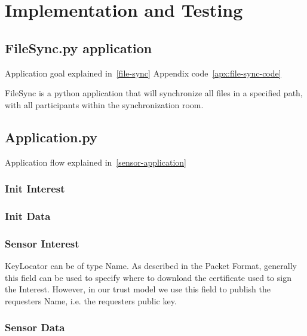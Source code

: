 \chapter{Implementation and Testing}

\section{FileSync.py application}
Application goal explained in~\autoref{file-sync}
Appendix code~\autoref{apx:file-sync-code}

FileSync is a python application that will synchronize all files in a specified path, with all participants within the synchronization room.

\section{Application.py}
Application flow explained in~\autoref{sensor-application}

\subsection{Init Interest}

\subsection{Init Data}

\subsection{Sensor Interest}
KeyLocator can be of type Name. 
As described in the  Packet Format, generally this field can be used to specify where to download the certificate used to sign the Interest.
However, in our trust model we use this field to publish the requesters Name, i.e. the requesters public key. 


\subsection{Sensor Data}